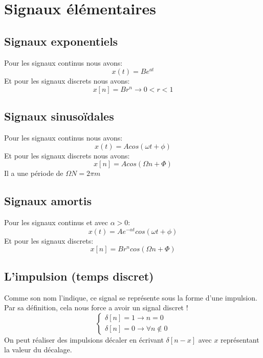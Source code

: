 \documentclass{report}
\begin{document}
\section{Signaux élémentaires}
\subsection{Signaux exponentiels}
Pour les signaux continus nous avons:
\begin{equation}
x(t) = B e^{at}
\end{equation}
Et pour les signaux discrets nous avons:
\begin{equation}
x[n] = Br^n \rightarrow 0 < r < 1
\end{equation}

\subsection{Signaux sinusoïdales}
Pour les signaux continus nous avons:
\begin{equation}
x(t) = A cos(\omega t + \phi)
\end{equation}
Et pour les signaux discrets nous avons:
\begin{equation}
x[n] = A cos(\Omega n + \Phi)
\end{equation}
Il a une période de $\Omega N = 2 \pi m$

\subsection{Signaux amortis}
Pour les signaux continus et avec $\alpha > 0$:
\begin{equation}
x(t) = A e^{-\alpha t}cos(\omega t + \phi)
\end{equation}
Et pour les signaux discrets:
\begin{equation}
x[n] = Br^ncos(\Omega n + \Phi)
\end{equation}

\subsection{L'impulsion (temps discret)}
Comme son nom l'indique, ce signal se représente sous la forme d'une impulsion. Par sa définition, cela nous force a avoir un signal discret !
\begin{equation}
\begin{cases}
\delta [n] = 1 \rightarrow n = 0 \\
\delta [n] = 0 \rightarrow \forall n \notin 0
\end{cases}
\end{equation}
On peut réaliser des impulsions décaler en écrivant $\delta [n-x]$ avec $x$ représentant la valeur du décalage.
\end{document}
